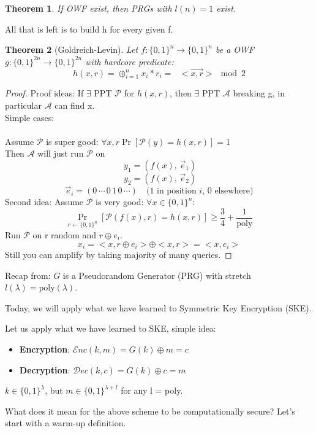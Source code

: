 \documentclass[11pt, a4paper]{article}
\newcommand{\enc}{\mathcal{E}nc}
\newcommand{\dec}{\mathcal{D}ec}
\newcommand{\poly}{\text{poly}}
\newtheorem{thm}{Theorem}
\begin{document}
\begin{thm}
    If OWF exist, then PRGs with $l(n) = 1$ exist.
\end{thm}
All that is left is to build h for every given f.\\
\begin{thm}[Goldreich-Levin]
    Let $f\colon\{0,1\}^n \rightarrow \{0,1\}^n$ be a OWF $g\colon\{0,1\}^{2n} \rightarrow \{0,1\}^{2n}$ with hardcore predicate:
    $$h(x,r) = \oplus_{i=1}^{n}  x_i * r_i =\text{ } <\vec{x,r}>\mod 2$$
\end{thm}
\begin{proof}
    Proof ideas: If $\exists \text{ PPT } \mathcal{P}$ for $h(x,r)$, then $\exists$ PPT $\mathcal{A}$ breaking g, in particular $\mathcal{A}$ can find x.\\
    Simple cases:\\\\
    Assume $\mathcal{P}$ is super good: $\forall x,r \Pr[\mathcal{P}(y) = h(x,r)] = 1$\\
    Then $\mathcal{A}$ will just run $\mathcal{P}$ on 
     \[
\ y_1 = \left( f(x),\, \vec{e}_1 \right)
\]
\[
\ y_2 = \left( f(x),\, \vec{e}_2 \right)
\]
\[
\vec{e}_i = (0\,\cdots\,0\,1\,0\,\cdots) \quad \text{($1$ in position $i$, $0$ elsewhere)}
\]
Second idea: Assume $\mathcal{P}$ is very good: $\forall x \in \{0,1\}^n$:\\
$$\Pr_{r \leftarrow \{0,1\}^n}[\mathcal{P}(f(x),r) = h(x,r)] \geq \frac{3}{4} + \frac{1}{\text{poly}}$$
Run $\mathcal{P}$ on r random and $r \oplus e_i$.
$$x_i = <x,r\oplus e_i> \oplus <x,r> = <x,e_i>$$
Still you can amplify by taking majority of many queries.
\end{proof}

Recap from: $G$ is a Pseudorandom Generator (PRG) with stretch $l(\lambda) = \poly(\lambda)$.

Today, we will apply what we have learned to Symmetric Key Encryption (SKE).

Let us apply what we have learned to SKE, simple idea:
\begin{itemize}
    \item \textbf{Encryption}: $\enc(k, m) = G(k) \oplus m = c$
    \item \textbf{Decryption}: $\dec(k, c) = G(k) \oplus c = m$
\end{itemize}
$k \in \{0,1\}^\lambda$, but $m \in \{0,1\}^{\lambda + l}$ for any l = poly.
\hrulefill

What does it mean for the above scheme to be computationally secure? Let's start with a warm-up definition.
\end{document}
